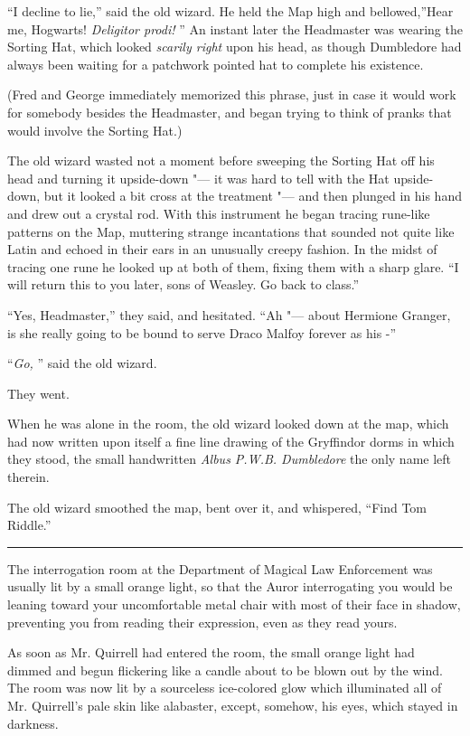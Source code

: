 ``I decline to lie,'' said the old wizard. He held the Map high and
bellowed,''Hear me, Hogwarts! \emph{Deligitor prodi!} '' An instant later
the Headmaster was wearing the Sorting Hat, which looked \emph{scarily
right} upon his head, as though Dumbledore had always been waiting for a
patchwork pointed hat to complete his existence.

(Fred and George immediately memorized this phrase, just in case it
would work for somebody besides the Headmaster, and began trying to
think of pranks that would involve the Sorting Hat.)

The old wizard wasted not a moment before sweeping the Sorting Hat off
his head and turning it upside-down "--- it was hard to tell with the Hat
upside-down, but it looked a bit cross at the treatment "--- and then
plunged in his hand and drew out a crystal rod. With this instrument he
began tracing rune-like patterns on the Map, muttering strange
incantations that sounded not quite like Latin and echoed in their ears
in an unusually creepy fashion. In the midst of tracing one rune he
looked up at both of them, fixing them with a sharp glare. ``I will
return this to you later, sons of Weasley. Go back to class.''

``Yes, Headmaster,'' they said, and hesitated. ``Ah "--- about Hermione
Granger, is she really going to be bound to serve Draco Malfoy forever
as his -''

``\emph{Go,} '' said the old wizard.

They went.

When he was alone in the room, the old wizard looked down at the map,
which had now written upon itself a fine line drawing of the Gryffindor
dorms in which they stood, the small handwritten \emph{Albus P.W.B.
Dumbledore} the only name left therein.

The old wizard smoothed the map, bent over it, and whispered, ``Find Tom
Riddle.''

\begin{center}\rule{3in}{0.4pt}\end{center}

The interrogation room at the Department of Magical Law Enforcement was
usually lit by a small orange light, so that the Auror interrogating you
would be leaning toward your uncomfortable metal chair with most of
their face in shadow, preventing you from reading their expression, even
as they read yours.

As soon as Mr. Quirrell had entered the room, the small orange light had
dimmed and begun flickering like a candle about to be blown out by the
wind. The room was now lit by a sourceless ice-colored glow which
illuminated all of Mr. Quirrell's pale skin like alabaster, except,
somehow, his eyes, which stayed in darkness.

